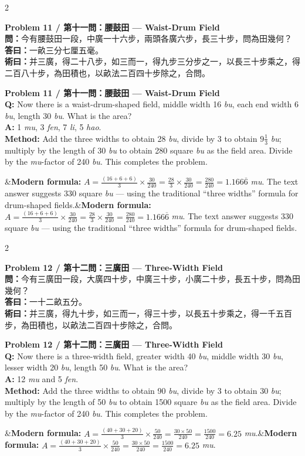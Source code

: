 \documentclass[11pt,a4paper]{article}
\newcommand{\bilingualproblem}[4]{%
  \begin{paracol}{2}
  \begin{leftcolumn}
  \noindent\textbf{\color{problemcolor}#1}\\[0.2cm]
  #2
  \end{leftcolumn}
  \switchcolumn
  \noindent\textbf{\color{problemcolor}#1}\\[0.2cm]
  #3
  \end{paracol}
  \ifx&#4&\else\vspace{0.3cm}\noindent#4\fi
  \vspace{0.5cm}
}
\newcommand{\wen}[1]{\textcolor{problemcolor}{\textbf{問：}}#1}
\newcommand{\da}[1]{\textcolor{answercolor}{\textbf{答曰：}}#1}
\newcommand{\shu}[1]{\textcolor{methodcolor}{\textbf{術曰：}}#1}
\newcommand{\wenen}[1]{\textcolor{problemcolor}{\textbf{Q:}} #1}
\newcommand{\daen}[1]{\textcolor{answercolor}{\textbf{A:}} #1}
\newcommand{\shuen}[1]{\textcolor{methodcolor}{\textbf{Method:}} #1}
\begin{document}
\bilingualproblem{Problem 11 / 第十一問：腰鼓田 --- Waist-Drum Field}{
\wen{今有腰鼓田一段，中廣一十六步，兩頭各廣六步，長三十步，問為田幾何？}\\[0.2cm]
\da{一畝三分七厘五毫。}\\[0.2cm]
\shu{并三廣，得二十八步，如三而一，得九步三分步之一，以長三十步乘之，得二百八十步，為田積也，以畝法二百四十步除之，合問。}
}{
\wenen{Now there is a waist-drum-shaped field, middle width 16 \textit{bu}, each end width 6 \textit{bu}, length 30 \textit{bu}. What is the area?}\\[0.2cm]
\daen{1 \textit{mu}, 3 \textit{fen}, 7 \textit{li}, 5 \textit{hao}.}\\[0.2cm]
\shuen{Add the three widths to obtain 28 \textit{bu}, divide by 3 to obtain $9\frac{1}{3}$ \textit{bu}; multiply by the length of 30 \textit{bu} to obtain 280 square \textit{bu} as the field area. Divide by the \textit{mu}-factor of 240 \textit{bu}. This completes the problem.}
}{\textbf{Modern formula:} $A = \frac{(16+6+6)}{3} \times \frac{30}{240} = \frac{28}{3} \times \frac{30}{240} = \frac{280}{240} = 1.166\overline{6}$ \textit{mu}. The text answer suggests 330 square \textit{bu} --- using the traditional ``three widths'' formula for drum-shaped fields.}

\bilingualproblem{Problem 12 / 第十二問：三廣田 --- Three-Width Field}{
\wen{今有三廣田一段，大廣四十步，中廣三十步，小廣二十步，長五十步，問為田幾何？}\\[0.2cm]
\da{一十二畝五分。}\\[0.2cm]
\shu{并三廣，得九十步，如三而一，得三十步，以長五十步乘之，得一千五百步，為田積也，以畝法二百四十步除之，合問。}
}{
\wenen{Now there is a three-width field, greater width 40 \textit{bu}, middle width 30 \textit{bu}, lesser width 20 \textit{bu}, length 50 \textit{bu}. What is the area?}\\[0.2cm]
\daen{12 \textit{mu} and 5 \textit{fen}.}\\[0.2cm]
\shuen{Add the three widths to obtain 90 \textit{bu}, divide by 3 to obtain 30 \textit{bu}; multiply by the length of 50 \textit{bu} to obtain 1500 square \textit{bu} as the field area. Divide by the \textit{mu}-factor of 240 \textit{bu}. This completes the problem.}
}{\textbf{Modern formula:} $A = \frac{(40+30+20)}{3} \times \frac{50}{240} = \frac{30 \times 50}{240} = \frac{1500}{240} = 6.25$ \textit{mu}.}

\newpage
\end{document}
